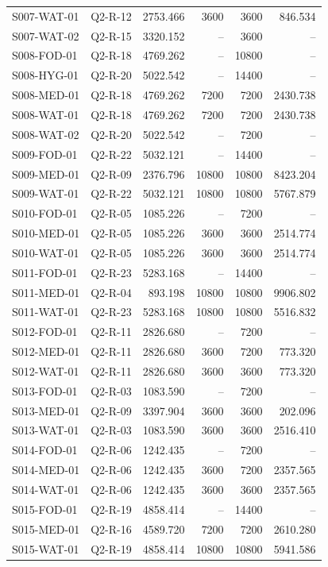 \documentclass[withoutpreface,colorprint]{format}
\numberwithin{equation}{section}
\numberwithin{figure}{section}
\numberwithin{table}{section}
\begin{document}
\begin{longtable}{@{}llrrrr@{}}
S007-WAT-01 & Q2-R-12 & 2753.466 & 3600 & 3600 & 846.534\\
S007-WAT-02 & Q2-R-15 & 3320.152 & -- & 3600 & --\\
S008-FOD-01 & Q2-R-18 & 4769.262 & -- & 10800 & --\\
S008-HYG-01 & Q2-R-20 & 5022.542 & -- & 14400 & --\\
S008-MED-01 & Q2-R-18 & 4769.262 & 7200 & 7200 & 2430.738\\
S008-WAT-01 & Q2-R-18 & 4769.262 & 7200 & 7200 & 2430.738\\
S008-WAT-02 & Q2-R-20 & 5022.542 & -- & 7200 & --\\
S009-FOD-01 & Q2-R-22 & 5032.121 & -- & 14400 & --\\
S009-MED-01 & Q2-R-09 & 2376.796 & 10800 & 10800 & 8423.204\\
S009-WAT-01 & Q2-R-22 & 5032.121 & 10800 & 10800 & 5767.879\\
S010-FOD-01 & Q2-R-05 & 1085.226 & -- & 7200 & --\\
S010-MED-01 & Q2-R-05 & 1085.226 & 3600 & 3600 & 2514.774\\
S010-WAT-01 & Q2-R-05 & 1085.226 & 3600 & 3600 & 2514.774\\
S011-FOD-01 & Q2-R-23 & 5283.168 & -- & 14400 & --\\
S011-MED-01 & Q2-R-04 & 893.198 & 10800 & 10800 & 9906.802\\
S011-WAT-01 & Q2-R-23 & 5283.168 & 10800 & 10800 & 5516.832\\
S012-FOD-01 & Q2-R-11 & 2826.680 & -- & 7200 & --\\
S012-MED-01 & Q2-R-11 & 2826.680 & 3600 & 7200 & 773.320\\
S012-WAT-01 & Q2-R-11 & 2826.680 & 3600 & 3600 & 773.320\\
S013-FOD-01 & Q2-R-03 & 1083.590 & -- & 7200 & --\\
S013-MED-01 & Q2-R-09 & 3397.904 & 3600 & 3600 & 202.096\\
S013-WAT-01 & Q2-R-03 & 1083.590 & 3600 & 3600 & 2516.410\\
S014-FOD-01 & Q2-R-06 & 1242.435 & -- & 7200 & --\\
S014-MED-01 & Q2-R-06 & 1242.435 & 3600 & 7200 & 2357.565\\
S014-WAT-01 & Q2-R-06 & 1242.435 & 3600 & 3600 & 2357.565\\
S015-FOD-01 & Q2-R-19 & 4858.414 & -- & 14400 & --\\
S015-MED-01 & Q2-R-16 & 4589.720 & 7200 & 7200 & 2610.280\\
S015-WAT-01 & Q2-R-19 & 4858.414 & 10800 & 10800 & 5941.586\\
\bottomrule
\end{longtable}
\end{document}

